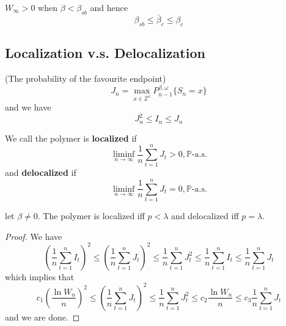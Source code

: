 \begin{theorem}
    $W_{\infty} > 0$ when $\beta < \beta_{sb}$ and hence
    \[
    \beta_{sb} \leq \bar{\beta}_c \leq \beta_c
    \]
\end{theorem}

\subsection{Localization v.s. Delocalization}

\begin{definition}
    (The probability of the favourite endpoint)
    \[
    J_n = \max_{x\in\mathbb{Z^d}}P_{n-1}^{\beta,\omega}\{S_n = x\}
    \]
    and we have
    \[
    J_n^2 \leq I_n \leq J_n
    \]
\end{definition}

\begin{definition}
    We call the polymer is \textbf{localized} if
    \[
    \liminf_{n\to\infty}\dfrac{1}{n}\sum\limits_{t=1}^n J_t > 0,\mathbb{P}\text{-a.s.}
    \]
    and \textbf{delocalized} if
    \[
    \liminf_{n\to\infty}\dfrac{1}{n}\sum\limits_{t=1}^n J_t = 0,\mathbb{P}\text{-a.s.}
    \]
\end{definition}

\begin{theorem}
    let $\beta \neq 0$. The polymer is localized iff $p<\lambda$ and delocalized iff $p=\lambda$.
\end{theorem}
\begin{proof}
    We have
    \[
    \left(\dfrac{1}{n}\sum\limits_{t=1}^n I_t\right)^2 \leq \left(\dfrac{1}{n}\sum\limits_{t=1}^n J_t\right)^2 \leq \dfrac{1}{n}\sum\limits_{t=1}^n J_t^2 \leq \dfrac{1}{n}\sum\limits_{t=1}^n I_t \leq \dfrac{1}{n}\sum\limits_{t=1}^n J_t
    \]
    which implies that
    \[
    c_1\left(\dfrac{\ln W_n}{n}\right)^2 \leq \left(\dfrac{1}{n}\sum\limits_{t=1}^n J_t\right)^2 \leq \dfrac{1}{n}\sum\limits_{t=1}^n J_t^2 \leq c_2 \dfrac{\ln W_n}{n} \leq c_3 \dfrac{1}{n}\sum\limits_{t=1}^n J_t
    \]
    and we are done.
\end{proof}

